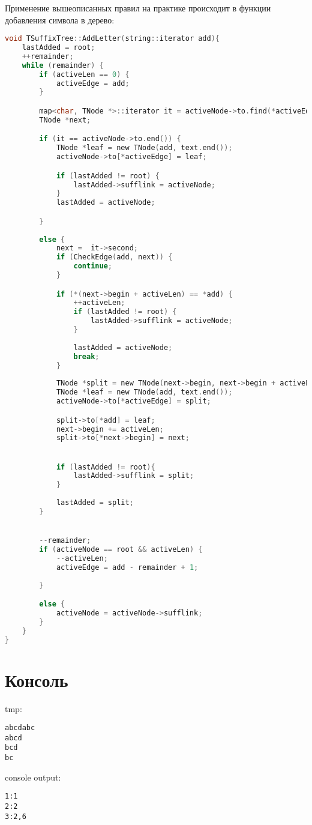 Применение вышеописанных правил на практике происходит в функции добавления символа в дерево:\newline


\begin{lstlisting}[language=C]
void TSuffixTree::AddLetter(string::iterator add){
    lastAdded = root;
    ++remainder;
    while (remainder) {
        if (activeLen == 0) {
            activeEdge = add;
        }

        map<char, TNode *>::iterator it = activeNode->to.find(*activeEdge);
        TNode *next;

        if (it == activeNode->to.end()) {
            TNode *leaf = new TNode(add, text.end());
            activeNode->to[*activeEdge] = leaf;

            if (lastAdded != root) {
                lastAdded->sufflink = activeNode;    
            }
            lastAdded = activeNode;

        } 
        
        else {
            next =  it->second;
            if (CheckEdge(add, next)) {
                continue;
            }

            if (*(next->begin + activeLen) == *add) {
                ++activeLen;
                if (lastAdded != root) {
                    lastAdded->sufflink = activeNode; 
                }
                          
                lastAdded = activeNode;  
                break;
            }
            
            TNode *split = new TNode(next->begin, next->begin + activeLen);
            TNode *leaf = new TNode(add, text.end());
            activeNode->to[*activeEdge] = split;

            split->to[*add] = leaf;
            next->begin += activeLen;
            split->to[*next->begin] = next;


            if (lastAdded != root){ 
                lastAdded->sufflink = split; 
            }             
                
            lastAdded = split; 
        }


        --remainder;
        if (activeNode == root && activeLen) {
            --activeLen;
            activeEdge = add - remainder + 1;
            
        } 

        else {
            activeNode = activeNode->sufflink;
        }
    }
}
\end{lstlisting}



\section{Консоль}
tmp:
\begin{alltt}
abcdabc
abcd
bcd
bc
\end{alltt}

console output:
\begin{alltt}
1: 1
2: 2
3: 2, 6
\end{alltt}
\pagebreak